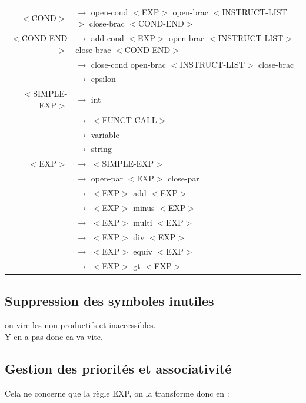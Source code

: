 \documentclass[a4paper,10pt]{article}
\begin{document}
\begin{tabular}{rl}
$<$COND$>$			& $\rightarrow$ open-cond $<$EXP$>$ open-brac $<$INSTRUCT-LIST$>$ close-brac $<$COND-END$>$\\



$<$COND-END$>$		& $\rightarrow$ add-cond $<$EXP$>$ open-brac $<$INSTRUCT-LIST$>$ close-brac $<$COND-END$>$ \\
					& $\rightarrow$ close-cond open-brac $<$INSTRUCT-LIST$>$ close-brac\\
					& $\rightarrow$ epsilon \\
					
$<$SIMPLE-EXP$>$	& $\rightarrow$ int \\
					& $\rightarrow$ $<$FUNCT-CALL$>$ \\
					& $\rightarrow$ variable \\
					& $\rightarrow$ string \\				

$<$EXP$>$			& $\rightarrow$ $<$SIMPLE-EXP$>$   \\
					& $\rightarrow$ open-par $<$EXP$>$ close-par\\ 
					& $\rightarrow$ $<$EXP$>$ add $<$EXP$>$ \\
					& $\rightarrow$ $<$EXP$>$ minus $<$EXP$>$ \\
					& $\rightarrow$ $<$EXP$>$ multi $<$EXP$>$ \\
					& $\rightarrow$ $<$EXP$>$ div $<$EXP$>$ \\
					& $\rightarrow$ $<$EXP$>$ equiv $<$EXP$>$ \\
					& $\rightarrow$ $<$EXP$>$ gt $<$EXP$>$ \\
					
					
\end{tabular}











\subsection{Suppression des symboles inutiles}
	
	on vire les non-productifs et inaccessibles.\\
	Y en a pas donc ca va vite.
	






	
\subsection{Gestion des priorités et associativité}
	Cela ne concerne que la règle EXP, on la transforme donc en : \\
	
\end{document}
